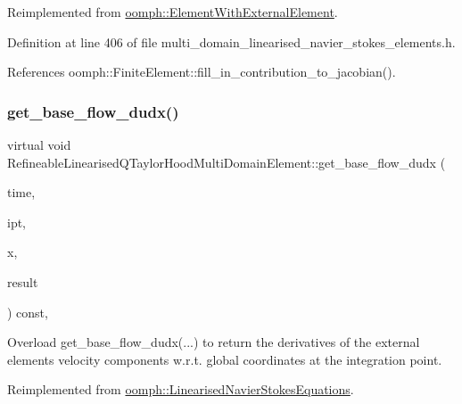 Reimplemented from \hyperlink{classoomph_1_1ElementWithExternalElement_ae5fb09552a8271e891438f8d058ca1b8}{oomph\+::\+Element\+With\+External\+Element}.



Definition at line 406 of file multi\+\_\+domain\+\_\+linearised\+\_\+navier\+\_\+stokes\+\_\+elements.\+h.



References oomph\+::\+Finite\+Element\+::fill\+\_\+in\+\_\+contribution\+\_\+to\+\_\+jacobian().

\mbox{\label{classRefineableLinearisedQTaylorHoodMultiDomainElement_ad22978ef877f7a79f05a613a9aa101fd}} 
\subsubsection{\texorpdfstring{get\+\_\+base\+\_\+flow\+\_\+dudx()}{get\_base\_flow\_dudx()}}
{\footnotesize\ttfamily virtual void Refineable\+Linearised\+Q\+Taylor\+Hood\+Multi\+Domain\+Element\+::get\+\_\+base\+\_\+flow\+\_\+dudx (\begin{DoxyParamCaption}\item[{const double \&}]{time,  }\item[{const unsigned \&}]{ipt,  }\item[{const \hyperlink{classoomph_1_1Vector}{Vector}$<$ double $>$ \&}]{x,  }\item[{\hyperlink{classoomph_1_1DenseMatrix}{Dense\+Matrix}$<$ double $>$ \&}]{result }\end{DoxyParamCaption}) const\hspace{0.3cm}{\ttfamily [inline]}, {\ttfamily [virtual]}}



Overload get\+\_\+base\+\_\+flow\+\_\+dudx(...) to return the derivatives of the external element\textquotesingle{}s velocity components w.\+r.\+t. global coordinates at the integration point. 



Reimplemented from \hyperlink{classoomph_1_1LinearisedNavierStokesEquations_ab4b45c111571d3904985dcefcae8ef67}{oomph\+::\+Linearised\+Navier\+Stokes\+Equations}.



